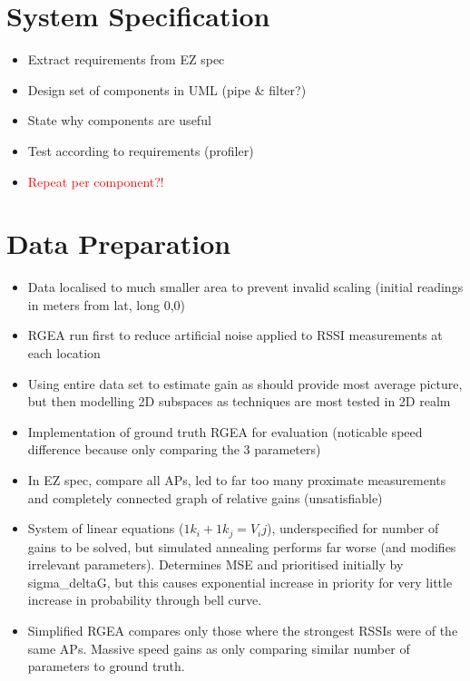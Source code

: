 \documentclass{UoYCSproject}
\begin{document}
		\section{System Specification}
		
			\begin{itemize}
				\item Extract requirements from EZ spec
				\item Design set of components in UML (pipe & filter?)
				\item State why components are useful
				\item Test according to requirements (profiler)
				\item \textcolor{red}{Repeat per component?!}
			\end{itemize}
		
		\section{Data Preparation}
		
			\begin{itemize}
				\item Data localised to much smaller area to prevent invalid scaling (initial readings in meters from lat, long 0,0)
				\item RGEA run first to reduce artificial noise applied to RSSI measurements at each location
				\item Using entire data set to estimate gain as should provide most average picture, but then modelling 2D subspaces as techniques are most tested in 2D realm
				\item Implementation of ground truth RGEA for evaluation (noticable speed difference because only comparing the 3 parameters)
				\item In EZ spec, compare all APs, led to far too many proximate measurements and completely connected graph of relative gains (unsatisfiable)
				\item System of linear equations ($1k_i + 1k_j = V_ij$), underspecified for number of gains to be solved, but simulated annealing performs far worse (and modifies irrelevant parameters). Determines MSE and prioritised initially by sigma_deltaG, but this causes exponential increase in priority for very little increase in probability through bell curve.
				\item Simplified RGEA compares only those where the strongest RSSIs were of the same APs. Massive speed gains as only comparing similar number of parameters to ground truth.
			\end{itemize}
		
\end{document}
